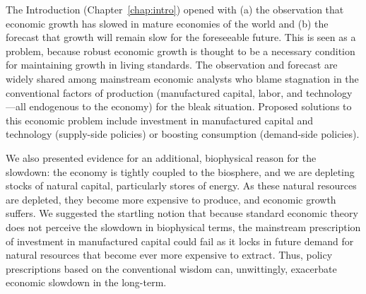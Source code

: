 

The Introduction (Chapter~\ref{chap:intro}) opened with
(a) the observation that economic growth has slowed
in mature economies of the world and
(b) the forecast that growth will remain slow for the foreseeable future. 
This is seen as a problem, 
because robust economic growth is thought to be a necessary condition
for maintaining growth in living standards.
The observation and forecast are widely shared among mainstream economic analysts 
who blame stagnation in the conventional factors of production 
(manufactured capital, labor, and technology---all endogenous to the economy) 
for the bleak situation. 
Proposed solutions to this economic problem include
investment in manufactured capital and technology (supply-side policies) 
or boosting consumption (demand-side policies).

We also 
presented evidence for an additional, 
biophysical reason for the slowdown:
the economy is tightly coupled to the biosphere,
and we are depleting stocks of natural capital,
particularly stores of energy.
As these natural resources are depleted,
they become more expensive to produce, and
economic growth suffers.
We suggested the startling notion that 
because standard economic theory 
does not perceive the slowdown in biophysical terms, 
the mainstream prescription of 
investment in manufactured capital could fail
as it locks in future demand for natural resources 
that become ever more expensive to extract.
Thus, policy prescriptions based on the conventional wisdom can, 
unwittingly, exacerbate economic slowdown in the long-term.

